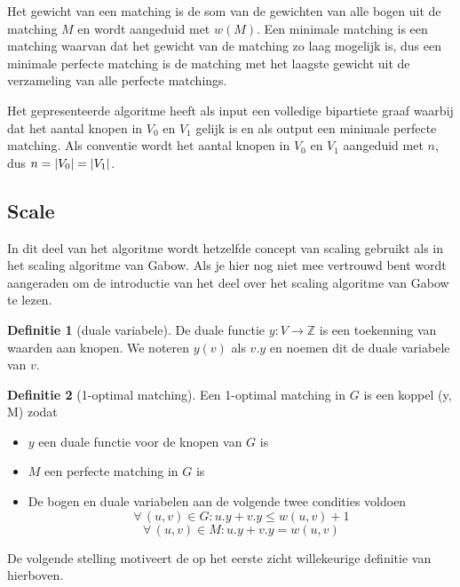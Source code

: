 \documentclass[conference]{IEEEtran}
\theoremstyle{definition}
\newtheorem{definition}{Definitie}[section]
\DeclarePairedDelimiter{\card}{\vert}{\vert}  %
\let \oldforall \forall
\renewcommand{\forall}{\oldforall\,}
\begin{document}
Het gewicht van een matching is de som van de gewichten van alle bogen uit de matching $M$ en wordt aangeduid met $w(M)$. Een minimale matching is een matching waarvan dat het gewicht van de matching zo laag mogelijk is, dus een minimale perfecte matching is de matching met het laagste gewicht uit de verzameling van alle perfecte matchings.

Het gepresenteerde algoritme heeft als input een volledige bipartiete graaf waarbij dat het aantal knopen in $V_0$ en $V_1$ gelijk is en als output een minimale perfecte matching. Als conventie wordt het aantal knopen in $V_0$ en $V_1$ aangeduid met $n$, dus $n = \card{V_0} = \card{V_1}$.

\subsection{Scale}
In dit deel van het algoritme wordt hetzelfde concept van scaling gebruikt als in het scaling algoritme van Gabow. Als je hier nog niet mee vertrouwd bent wordt aangeraden om de introductie van het deel over het scaling algoritme van Gabow te lezen.
\begin{definition}[duale variabele]
    De duale functie $y: V \longrightarrow \mathbb{Z}$ is een toekenning van waarden aan knopen. We noteren $y(v)$ als $v.y$ en noemen dit de duale variabele van $v$.
\end{definition}
\begin{definition}[1-optimal matching]
    Een 1-optimal matching in $G$ is een koppel (y, M) zodat
    \begin{itemize}
        \item $y$ een duale functie voor de knopen van $G$ is
        \item $M$ een perfecte matching in $G$ is
        \item De bogen en duale variabelen aan de volgende twee condities voldoen
            \begin{equation}
                \forall (u, v) \in G: u.y + v.y \leq w(u, v) + 1 \label{eq:def:oneOpt1}
            \end{equation}
            \begin{equation}
                \forall (u, v) \in M: u.y + v.y = w(u, v) \label{eq:def:oneOpt2}
            \end{equation}
    \end{itemize}
\end{definition}

De volgende stelling motiveert de op het eerste zicht willekeurige definitie van hierboven.
\end{document}
